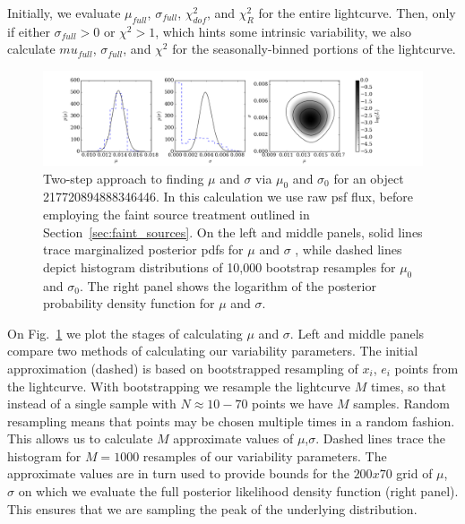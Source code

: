 \documentclass[fleqn,usenatbib]{mnras}  %
\begin{document}
Initially, we evaluate $\mu_{full}$, $\sigma_{full}$, $\chi^{2}_{dof}$, and $\chi^{2}_{R}$ for the entire lightcurve. Then, only if  either $\sigma_{full}>0$ or $\chi^{2}>1 $, which hints some intrinsic variability, we also calculate $mu_{full}$, $\sigma_{full}$, and $\chi^{2}$ for the seasonally-binned portions of the lightcurve.   


\begin{figure}
\label{fig:sigma_example}
\includegraphics[width=\textwidth]{Fig_5-8_AstroML_obj_217720894888346446_.png}
\cprotect\caption{Two-step approach to finding $\mu$ and $\sigma$ via $\mu_{0}$ and $\sigma_{0}$ for an object 217720894888346446. In this calculation we use raw psf flux, before employing the faint source treatment outlined in Section~\ref{sec:faint_sources}. On the left and middle panels,  solid lines trace marginalized posterior pdfs for $\mu$ and $\sigma$ , while dashed lines depict histogram distributions of 10,000 bootstrap resamples for $\mu_{0}$ and $\sigma_{0}$. The right panel shows the logarithm of the posterior probability density function for $\mu$ and $\sigma$.}
\end{figure}

On Fig.~\ref{fig:sigma_example} we plot the stages of calculating $\mu$ and $\sigma$. Left and middle panels compare two methods of calculating our variability parameters. The initial approximation (dashed) is based on bootstrapped resampling of $x_i$, $e_i$ points from  the lightcurve. With bootstrapping we resample the lightcurve $M$ times, so that instead of a single sample with $N \approx 10-70 $ points  we have $M$ samples. Random resampling means that points may be chosen multiple times in a random fashion. This allows us to calculate $M$ approximate values of $\mu$,$\sigma$. Dashed lines trace the histogram for $M=1000$ resamples of our variability parameters. The approximate values are in turn used to provide bounds for the $200 x 70$ grid of $\mu$, $\sigma$ on which we evaluate the full posterior likelihood density function (right panel). This ensures that we are sampling the peak of the underlying distribution. 
\end{document}
